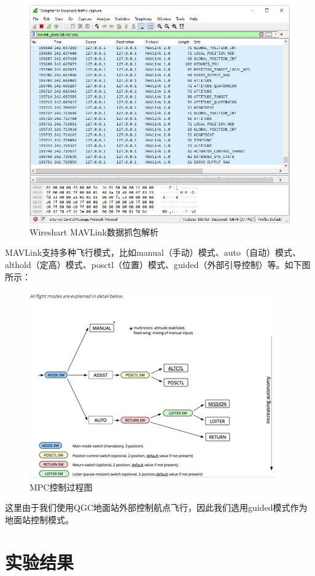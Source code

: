 \begin{figure}[ht]
  \centering
  \includegraphics[width=0.8\linewidth]{./Figure/Mavlink_Wireshark_Decode.jpg}
  \caption{Wireshart MAVLink数据抓包解析}\label{Fig:xd1}
\end{figure}

MAVLink支持多种飞行模式，比如manual（手动）模式、auto（自动）模式、althold（定高）模式、posctl（位置）模式、guided（外部引导控制）等。如下图所示：

\begin{figure}[ht]
  \centering
  \includegraphics[width=0.8\linewidth]{./Figure/Flight_Mode.png}
  \caption{MPC控制过程图}\label{Fig:xd1}
\end{figure}

这里由于我们使用QGC地面站外部控制航点飞行，因此我们选用guided模式作为地面站控制模式。

\chapter{实验结果}

